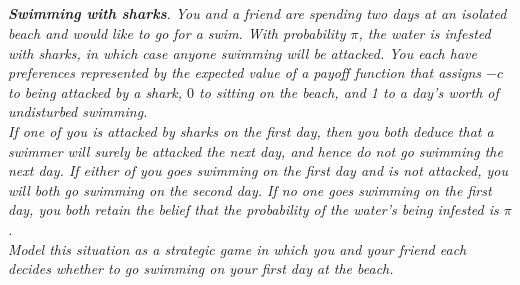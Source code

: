 \documentclass[12pt]{amsart}
\begin{document}
\subsection{}
\textit{\textbf{Swimming with sharks}. You and a friend are spending two days at an isolated beach and
	would like to go for a swim. With probability $\pi$, the water is infested with sharks, in which
	case anyone swimming will be attacked. You each have preferences represented by the
	expected value of a payoff function that assigns $-c$ to being attacked by a shark, $0$ to sitting
	on the beach, and 1 to a day’s worth of undisturbed swimming. \\
	If one of you is attacked by sharks on the first day, then you both deduce that a swimmer
	will surely be attacked the next day, and hence do not go swimming the next day. If either
	of you goes swimming on the first day and is not attacked, you will both go swimming on
	the second day. If no one goes swimming on the first day, you both retain the belief that
	the probability of the water’s being infested is $\pi$. \\
	Model this situation as a strategic game in which you and your friend each decides whether
	to go swimming on your first day at the beach.}
\end{document}
